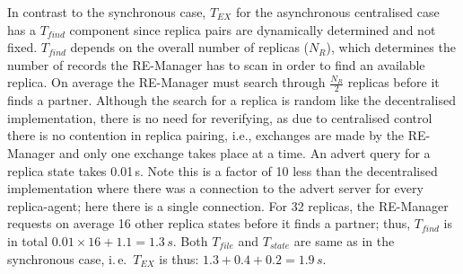 \documentclass{rspublic}
\newcommand{\alnote}[1]{ {\textcolor{blue} { ***andre: #1 }}}
\newcommand{\athotanote}[1]{ {\textcolor{green} { ***athota: #1 }}}
\newcommand{\alnote}[1]{}
\newcommand{\athotanote}[1]{}
\begin{document}




In contrast to the synchronous case, $T_{EX}$ for the asynchronous
centralised case has a $T_{find}$ component since replica pairs are
dynamically determined and not fixed. $T_{find}$ depends on the overall
number of replicas ($N_R$), which determines the number of records the
RE-Manager has to scan in order to find an available replica. On
average the RE-Manager must search through $\frac{N_R}{2}$ replicas before it
finds a partner. Although the search for a replica is random like the
decentralised implementation, there is no need for reverifying, as due
to centralised control there is no contention in replica pairing,
i.e., exchanges are made by the RE-Manager and only one exchange takes
place at a time.  An advert query for a replica state takes
0.01\,s. Note this is a factor of 10 less than the decentralised
implementation where there was a connection to the advert server for
every replica-agent; here there is a single connection. For 32
replicas, the RE-Manager requests on average 16 other replica states
before it finds a partner; thus, $T_{find}$ is in total
$0.01\times16+1.1=1.3\,s$. Both $T_{file}$ and $T_{state}$ are same as in the
synchronous case, i.\,e.\ $T_{EX}$ is thus: $1.3+0.4+0.2=1.9\,s$.
\end{document}

